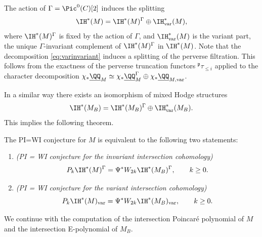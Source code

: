 The action of $\Gamma = \Pic^0(C)[2]$ induces the splitting
\begin{equation}\label{eq:varinvariant}
\IH^*(M) = \IH^*(M)^{\Gamma} \oplus \IH_{\mathrm{var}}^*(M),
\end{equation}
where $\IH^*(M)^{\Gamma}$ is fixed by the action of $\Gamma$, and $\IH_{\mathrm{var}}^*(M)$ is the {variant} part, \ie the unique $\Gamma$-invariant complement of $\IH^*(M)^{\Gamma}$ in $\IH^*(M)$. Note that the decomposition \eqref{eq:varinvariant} induces a splitting of the perverse filtration. This follows from the exactness of the perverse truncation functors $^{\mathfrak{p}}\tau_{\leq i}$ applied to the character decomposition $\chi_*\underline{\QQ}_M \simeq \chi_*\underline{\QQ}^{\Gamma}_M \oplus \chi_*\underline{\QQ}_{M, \mathrm{var}}$.

In a similar way there exists an isomorphism of mixed Hodge structures
\[
\IH^*(M_B) = \IH^*(M_B)^{\Gamma} \oplus \IH_{\mathrm{var}}^*(M_B).
\]
This implies the following theorem.

\pagebreak[2]
\begin{thm}\label{Thm:PWinv and var}
The PI=WI conjecture for $M$ is equivalent to the following two statements:
\begin{enumerate}
\item \emph{(PI = WI conjecture for the invariant intersection cohomology)}
\begin{equation}\label{eq:invariantPIWI}
P_k\IH^*(M)^{\Gamma}= \Psi^* W_{2k}\IH^*(M_B)^{\Gamma}, \qquad k \geq 0.
\end{equation}
\item \emph{(PI = WI conjecture for the variant intersection cohomology)}
\begin{equation}\label{eq:variantPIWI}
P_k\IH^*(M)_{\mathrm{var}}= \Psi^* W_{2k}\IH^*(M_B)_{\mathrm{var}}, \qquad k \geq 0.
\end{equation}
\end{enumerate}
\end{thm}

We continue with the computation of the intersection Poincaré polynomial of $M$ and the intersection E-polynomial of $M_B$.

